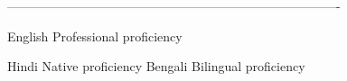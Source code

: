 -------------------------------------------------------------------------------

\begin{cvskills}

  \cvskill
    {English} %
    {Professional proficiency} %

  \cvskill
    {Hindi} %
    {Native proficiency} %
  \cvskill
    {Bengali} %
    {Bilingual proficiency} %

\end{cvskills}
